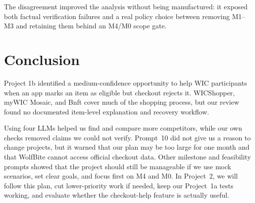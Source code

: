 \documentclass[sigconf]{acmart}
\begin{document}
The disagreement improved the analysis without being manufactured: it exposed
both factual verification failures and a real policy choice between removing
M1--M3 and retaining them behind an M4/M0 scope gate.

\section{Conclusion}

Project 1b identified a medium-confidence opportunity to help WIC participants
when an app marks an item as eligible but checkout rejects it. WICShopper, myWIC
Mosaic, and Bnft cover much of the shopping process, but our review found no
documented item-level explanation and recovery workflow.

Using four LLMs helped us find and compare more competitors, while our own
checks removed claims we could not verify. Prompt~10 did not give us a reason to
change projects, but it warned that our plan may be too large for one month and
that WolfBite cannot access official checkout data. Other milestone and
feasibility prompts showed that the project should still be manageable if we
use mock scenarios, set clear goals, and focus first on M4 and M0. In
Project~2, we will follow this plan, cut lower-priority work if needed, keep our
Project~1a tests working, and evaluate whether the checkout-help feature is
actually useful.



\end{document}
